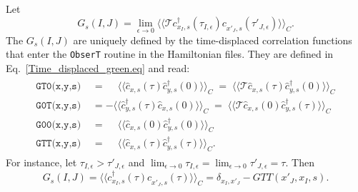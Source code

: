 Let
\begin{equation}
	G_s(I,J)   =  \lim_{\epsilon \rightarrow 0 }\langle \langle   \mathcal{T}   c^{\dagger}_{x_I,s}(\tau_{I,\epsilon}) c^{\phantom\dagger}_{x'_{J},s}(\tau'_{J,\epsilon})  \rangle \rangle_{C} .
\end{equation}
The $G_s(I,J)  $  are  uniquely defined by the time-displaced correlation   functions  that enter  the \texttt{ObserT}   routine in the Hamiltonian files.  They are defined in Eq.~\eqref{Time_displaced_green.eq} and read: 
\begin{align}
\begin{aligned}
\texttt{GT0(x,y,s) }  &=   \phantom{+} \langle \langle \hat{c}^{\phantom\dagger}_{x,s} (\tau)   \hat{c}^{\dagger}_{y,s} (0)   \rangle \rangle_C \;=\; \langle \langle \mathcal{T} \hat{c}^{\phantom\dagger}_{x,s} (\tau)   \hat{c}^{\dagger}_{y,s} (0)   \rangle \rangle_C   \\
\texttt{G0T(x,y,s) }   &=  -   \langle \langle   \hat{c}^{\dagger}_{y,s} (\tau)    \hat{c}^{\phantom\dagger}_{x,s} (0)    \rangle \rangle_C \;=\;
    \langle \langle \mathcal{T} \hat{c}^{\phantom\dagger}_{x,s} (0)    \hat{c}^{\dagger}_{y,s} (\tau)   \rangle \rangle_C  \\
  \texttt{G00(x,y,s) }  &=    \phantom{+} \langle \langle \hat{c}^{\phantom\dagger}_{x,s} (0)   \hat{c}^{\dagger}_{y,s} (0)   \rangle \rangle_C    \\
    \texttt{GTT(x,y,s) }  &=   \phantom{+} \langle \langle \hat{c}^{\phantom\dagger}_{x,s} (\tau)   \hat{c}^{\dagger}_{y,s} (\tau)   \rangle \rangle_C.
\end{aligned}
\end{align}
For instance, let  $\tau_{I,\epsilon}   > \tau'_{J,\epsilon}  $  and $ \lim_{\epsilon \rightarrow 0 } \tau_{I,\epsilon}   = \lim_{\epsilon \rightarrow 0 }\tau'_{J,\epsilon} = \tau$. Then 
\begin{equation}
	G_s(I,J)   =  \langle \langle  c^{\dagger}_{x_I,s}(\tau) c^{\phantom\dagger}_{x'_{J},s}(\tau)  \rangle \rangle_{C}  =   \delta_{x_I,x'_J} -  GTT(x'_J,x_I,s).
\end{equation}

